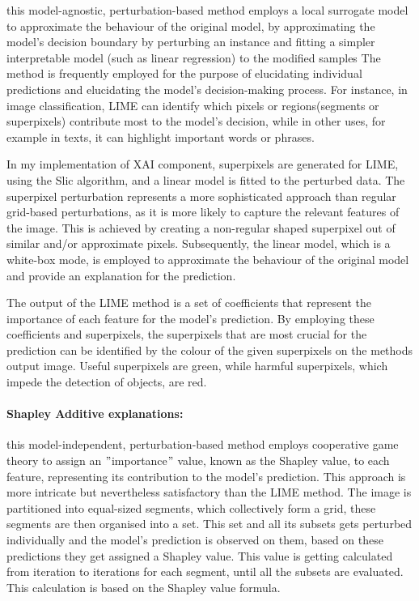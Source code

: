 this model-agnostic, perturbation-based method employs a local surrogate model to approximate the behaviour of the original model, by
approximating the  model's decision boundary by perturbing an instance and fitting a simpler interpretable model (such as linear regression) to the modified samples
The method is frequently employed for the purpose of elucidating individual predictions and elucidating the model's decision-making process. For instance, in image classification, LIME can identify which pixels or regions(segments or superpixels) contribute most to the model's decision, while in other uses, for example in texts, it can highlight important words or phrases.

In my implementation of XAI component,  superpixels are generated for LIME, using the Slic algorithm, and a linear model is fitted to the perturbed data.
The superpixel perturbation represents a more sophisticated approach than regular grid-based perturbations, as it is more likely to capture the relevant features of the image.
This is achieved by creating a non-regular shaped superpixel out of similar and/or approximate pixels.
Subsequently, the linear model, which is a white-box mode, is employed to approximate the behaviour of the original model and provide an explanation for the prediction.

The output of the LIME method is a set of coefficients that represent the importance of each feature for the model's prediction.
By employing these coefficients and superpixels, the superpixels that are most crucial for the prediction can be identified by the
colour of the given superpixels on the methods output image.
Useful superpixels are green, while harmful superpixels, which impede the detection of objects, are red.


\paragraph{Shapley Additive explanations:}\label{par:shap}

this model-independent, perturbation-based method employs cooperative game theory to assign an \("\)importance\("\) value,
known as the Shapley value, to each feature, representing its contribution to the model's prediction.
This approach is more intricate but nevertheless satisfactory than the LIME method.
The image is partitioned into equal-sized segments, which collectively form a grid, these segments are then organised into a set.
This set and all its subsets gets perturbed individually and the model's prediction is observed on them, based on these predictions
they get assigned a Shapley value.
This value is getting calculated from iteration to iterations for each segment, until all the subsets are evaluated.
This calculation is based on the Shapley value formula.

